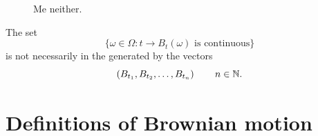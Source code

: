 \documentclass{report}
\begin{document}
\begin{enumerate}
\begin{figure}[h]
		\caption{Me neither.}
		\label{fig:screenshot005}
	\end{figure}
	\begin{remark}
		The set
		\begin{equation*}
			\{\omega\in\Omega:t\to B_{t}(\omega)\text{ is continuous}\}
		\end{equation*}
		is not necessarily in the \sa{} generated by the vectors
		\begin{equation*}
			\left(B_{t_{1}}, B_{t_{2}},\ldots,B_{t_{n}}\right)\qquad n\in\mathbb{N}.
		\end{equation*}
	\end{remark}
\end{enumerate}
\section{Definitions of Brownian motion}
\end{document}
